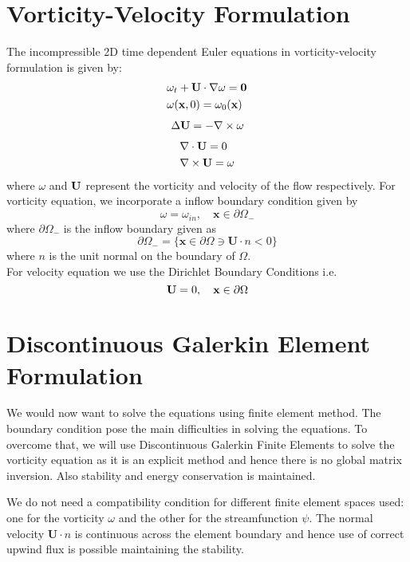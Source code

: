 \documentclass[11pt]{article}
\begin{document}
\section{Vorticity-Velocity Formulation} 
 The incompressible 2D time dependent Euler equations in vorticity-velocity
formulation is given by:
\begin{equation}\label{vor}
\begin{aligned}
&\omega_t + \bf{U}\cdot\nabla{\omega}=0\\
&\omega({\bf{x}},0)=\omega_0(\bf{x})\\
\end{aligned}
\end{equation}
\begin{equation}\label{vel}
\begin{aligned}
&\Delta{\bf{U}}=-\nabla\times\omega\\
\end{aligned}
\end{equation}
\begin{equation}\label{cons}
\begin{aligned}
& \nabla\cdot{\bf{U}}=0\\
&\nabla\times{\bf{U}} = \omega
\end{aligned}
\end{equation}
where $\omega$ and ${\bf{U}}$ represent the vorticity and velocity of the flow respectively.
For vorticity equation, we incorporate a inflow boundary condition given by 
$$
\omega = \omega_{in}, \quad \textbf{x}\in\partial\Omega_-
$$
where $\partial\Omega_-$ is the inflow boundary given as 
$$
\partial\Omega_-=\lbrace \textbf{x}\in\partial\Omega\ni\textbf{U}\cdot n < 0\rbrace
$$
where $n$ is the unit normal on the boundary of $\Omega$.\\
For velocity equation we use the Dirichlet Boundary Conditions
i.e.
$$
{\bf{U}}=0, \quad \textbf{x}\in\partial\Omega
$$
\section{Discontinuous Galerkin Element Formulation}
We would now want to solve the equations using finite element method.
 The boundary condition pose the main difficulties in solving the equations.
 To overcome that, we will use Discontinuous Galerkin Finite Elements to solve the vorticity equation 
 as it is an explicit method and hence there is no global 
matrix inversion. Also stability and energy conservation is maintained.
\par We do not need a compatibility condition for different finite element spaces used: one for the vorticity 
$\omega$ and the other for the streamfunction $\psi$. The normal velocity $\textbf{U}\cdot{n}$ is continuous 
across the element boundary and hence use of correct upwind flux is possible maintaining the stability.
\end{document}
